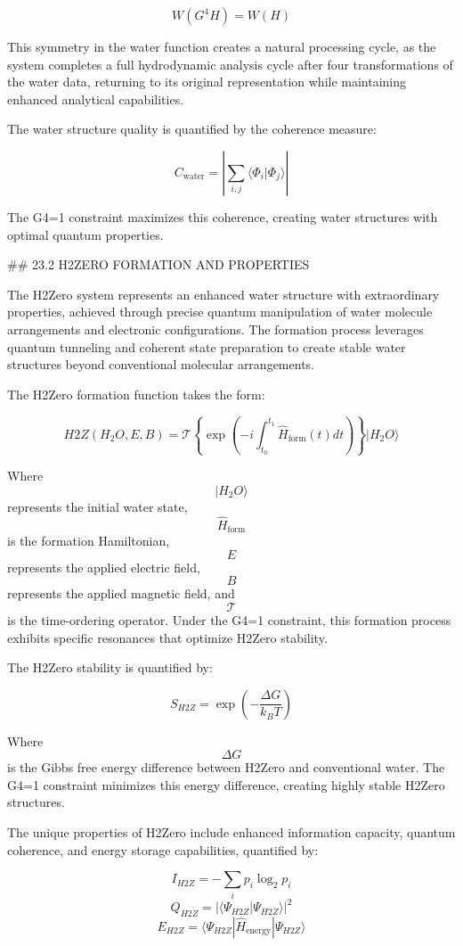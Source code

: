 $$ W(G^4 H) = W(H) $$

This symmetry in the water function creates a natural processing cycle, as the system completes a full hydrodynamic analysis cycle after four transformations of the water data, returning to its original representation while maintaining enhanced analytical capabilities.

The water structure quality is quantified by the coherence measure:

$$ C_{\text{water}} = \left|\sum_{i,j} \langle \Phi_i | \Phi_j \rangle \right| $$

The G4=1 constraint maximizes this coherence, creating water structures with optimal quantum properties.

## 23.2 H2ZERO FORMATION AND PROPERTIES

The H2Zero system represents an enhanced water structure with extraordinary properties, achieved through precise quantum manipulation of water molecule arrangements and electronic configurations. The formation process leverages quantum tunneling and coherent state preparation to create stable water structures beyond conventional molecular arrangements.

The H2Zero formation function takes the form:

$$ H2Z(H_2O, E, B) = \mathcal{T}\left\{ \exp\left(-i \int_{t_0}^{t_1} \hat{H}_{\text{form}}(t) dt\right) \right\} |H_2O\rangle $$

Where $$ |H_2O\rangle $$ represents the initial water state, $$ \hat{H}_{\text{form}} $$ is the formation Hamiltonian, $$ E $$ represents the applied electric field, $$ B $$ represents the applied magnetic field, and $$ \mathcal{T} $$ is the time-ordering operator. Under the G4=1 constraint, this formation process exhibits specific resonances that optimize H2Zero stability.

The H2Zero stability is quantified by:

$$ S_{H2Z} = \exp\left(-\frac{\Delta G}{k_B T}\right) $$

Where $$ \Delta G $$ is the Gibbs free energy difference between H2Zero and conventional water. The G4=1 constraint minimizes this energy difference, creating highly stable H2Zero structures.

The unique properties of H2Zero include enhanced information capacity, quantum coherence, and energy storage capabilities, quantified by:

$$ I_{H2Z} = -\sum_i p_i \log_2 p_i $$
$$ Q_{H2Z} = |\langle \Psi_{H2Z} | \Psi_{H2Z} \rangle|^2 $$
$$ E_{H2Z} = \langle \Psi_{H2Z} | \hat{H}_{\text{energy}} | \Psi_{H2Z} \rangle $$

